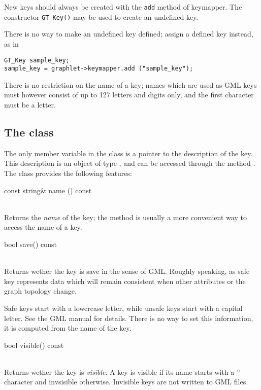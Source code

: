 \documentclass[twoside,fleqn]{report}
\begin{document}
\begin{notes}
  
  \item New keys should always be created with the \texttt{add}
  method of keymapper. The constructor \verb|GT_Key()| may be
  used to create an undefined key.
  
  \item There is no way to make an undefined key defined; assign a
  defined key instead, as in
\begin{verbatim}
GT_Key sample_key;
sample_key = graphlet->keymapper.add ("sample_key");
\end{verbatim}
  
  \item There is no restriction on the name of a key; names which
  are used as GML keys must however consist of up to 127 letters
  and digits only, and the first character must be a letter.
\end{notes}


\subsection{The class }
\label{s:GT_Key_description}

The only member variable in the class  is a pointer to the 
description of the key. This description is an object of type
, and can be accessed through the method
. The class  provides the 
following features:

\begin{Cdefinition}

  \item[const string\& name () const] \strut\\
  Returns the \emph{name} of the key; the method 
  is usually a more convenient way to access the name of a key.
  

  \item[bool save() const] \strut\\
  Returns wether the key is save in the sense of GML. Roughly
  speaking, as safe key represents data which will remain
  consistent when other attributes or the graph topology change.
  
  Safe keys start with a lowercase letter, while unsafe keys
  start with a capital letter.  See the GML manual for details.
  There is no way to set this information, it is computed from
  the name of the key.
  
  \item[bool visible() const] \strut\\
  Returns wether the key is \emph{visible}. A key is visible if
  its name starts with a '\@' character and invsisible otherwise.
  Invisible keys are not written to GML files.

\end{Cdefinition}
\end{document}

